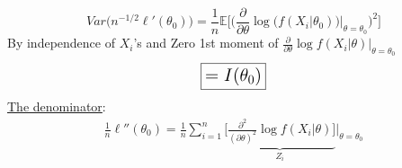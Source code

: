 \begin{equation*}
	Var \big( n^{-1/2}\ell ' (\theta_0) \big) = \frac{1}{n} \mathbb{E} \bigg[ \bigg(\frac{\partial}{\partial \theta} \log \bigg( f(X_i | \theta_0) \bigg) \bigg|_{\theta = \theta_0} \bigg)^2 \bigg]
\end{equation*}
By independence of $X_i$'s and Zero 1st moment of $\frac{\partial}{\partial \theta} \log f(X_i | \theta) \bigg|_{\theta = \theta_0}$
\begin{equation*}
	\boxed{\mathlarger{\mathlarger{= I (\theta_0)}}}
\end{equation*}
\underline{The denominator}: 
\begin{gather*}
	\frac{1}{n} \ell '' (\theta_0) = \frac{1}{n} \sum_{i=1}^n \underbrace{\bigg[ \frac{\partial^2}{(\partial \theta)^2} \log f(X_i | \theta) \bigg]}_{Z_i} \bigg|_{\theta = \theta_0}
\end{gather*}